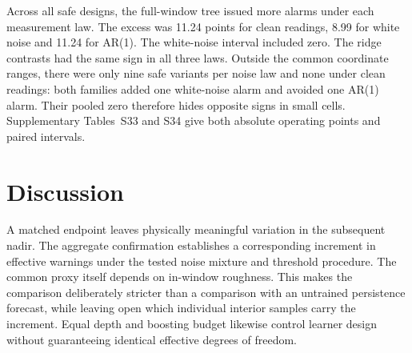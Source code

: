 \documentclass[10pt]{article}
\begin{document}
\begin{table}[htbp]\centering\small
\caption{Independent support-stratified test through 500 ms (four cumulative opportunities). Counts are full window/endpoint (measurement-variant denominator). Inside requires every first-window coordinate in both representations to lie within its training range. The false-alarm columns refer to safe designs. Paired differences are in percentage points with 95\% physical-design bootstrap intervals.}\label{tab:supportnew}
\end{table}
\par

Across all safe designs, the full-window tree issued more alarms under each measurement law. The excess was 11.24 points for clean readings, 8.99 for white noise and 11.24 for AR(1). The white-noise interval included zero. The ridge contrasts had the same sign in all three laws. Outside the common coordinate ranges, there were only nine safe variants per noise law and none under clean readings: both families added one white-noise alarm and avoided one AR(1) alarm. Their pooled zero therefore hides opposite signs in small cells. Supplementary Tables~S33 and S34 give both absolute operating points and paired intervals.

\section{Discussion}
A matched endpoint leaves physically meaningful variation in the subsequent nadir. The aggregate confirmation establishes a corresponding increment in effective warnings under the tested noise mixture and threshold procedure. The common proxy itself depends on in-window roughness. This makes the comparison deliberately stricter than a comparison with an untrained persistence forecast, while leaving open which individual interior samples carry the increment. Equal depth and boosting budget likewise control learner design without guaranteeing identical effective degrees of freedom.
\end{document}
